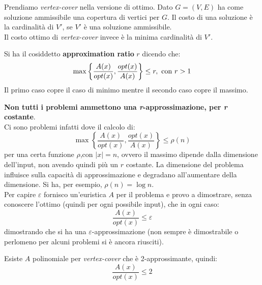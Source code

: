 												\begin{esempio}
													Prendiamo \textit{vertex-cover} nella versione di ottimo. Dato $G=(V,E)$ ha
													come soluzione ammissibile una copertura di vertici per $G$. Il costo di una
													soluzione è la cardinalità di $V'$, se $V'$ è una soluzione ammissibile.\\
													Il costo ottimo di \textit{vertex-cover} invece è la minima cardinalità di
													$V'$.
												\end{esempio}
												\begin{definizione}
													Si ha il cosiddetto \textbf{approximation ratio} $r$ dicendo che:
													\[\max\left\{\frac{A(x)}{opt(x)},\frac{opt(x)}{A(x)}\right\}\leq r,\mbox{
															\textnormal{con} }r>1\] 
														Il primo caso copre il caso di minimo mentre il secondo caso copre il massimo.
														\end{definizione}
														\textbf{Non tutti i problemi ammettono una \textit{r}-approssimazione, per
															\textit{r} costante}.\\
														Ci sono problemi infatti dove il calcolo di:
														\[\max\left\{\frac{A(x)}{opt(x)},\frac{opt(x)}{A(x)}\right\}\leq \rho(n)\]
														per una certa funzione $\rho$,con $|x|=n$,
														ovvero il massimo dipende dalla
														dimensione dell'input, non avendo quindi più un $r$ costante. La dimensione del
														problema influisce sulla capacità di approssimazione e degradano all'aumentare
														della dimensione. Si ha, per esempio, $\rho(n)=\log n$.\\
														Per capire $\varepsilon$ fornisco un'euristica $A$ per il problema e provo a
														dimostrare, senza conoscere l'ottimo (quindi per ogni possibile input), che in
														ogni caso:
														\[\frac{A(x)}{opt(x)}\leq \varepsilon\]
														dimostrando che si ha una $\varepsilon$-approssimazione (non sempre è
														dimostrabile o perlomeno per alcuni problemi si è ancora riusciti).
														\begin{definizione}
															Esiste $A$ polinomiale per \textit{vertex-cover} che è 2-approssimante,
															quindi:
															\[\frac{A(x)}{opt(x)}\leq 2\]
														\end{definizione}
